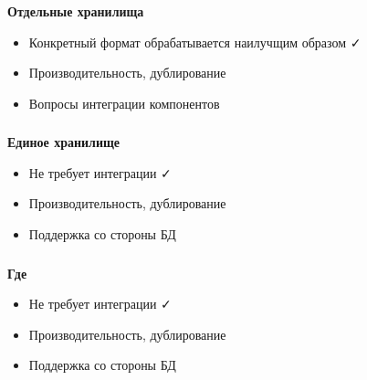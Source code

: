 \documentclass[18pt, compress, aspectratio=169]{beamer}
\def\check{\textcolor{check}{\FA \faCheck}}
\def\fail{\textcolor{fail}{\FA \faRemove}}
\def\question{\textcolor{question}{\FA \faSearch}}
\begin{document}
\begin{frame}
    \frametitle{}
    \begin{center}
        \textbf{Отдельные хранилища}
        \pause
        \begin{itemize}[label={\MVRightarrow}]
            \item <+-> Конкретный формат обрабатывается наилучщим образом \check
            \item <+-> Производительность, дублирование \question
            \item <+-> Вопросы интеграции компонентов \fail
        \end{itemize}
    \end{center}
\end{frame}

\begin{frame}
    \frametitle{}
    \begin{center}
        \textbf{Единое хранилище}
        \pause
        \begin{itemize}[label={\MVRightarrow}]
            \item <+-> Не требует интеграции \check
            \item <+-> Производительность, дублирование \question
            \item <+-> Поддержка со стороны БД \question
        \end{itemize}
    \end{center}
\end{frame}

\begin{frame}
    \frametitle{}
    \begin{center}
        \textbf{Где}
        \pause
        \begin{itemize}[label={\MVRightarrow}]
            \item Не требует интеграции \check
            \item Производительность, дублирование \question
            \item Поддержка со стороны БД \question
        \end{itemize}
    \end{center}
\end{frame}
\end{document}
